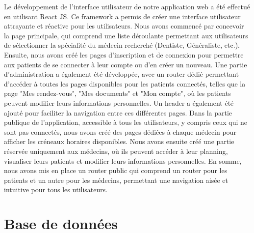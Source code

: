 \documentclass[a4paper]{report}
\begin{document}
Le développement de l'interface utilisateur de notre application web a été effectué en utilisant React JS. Ce framework a permis de créer une 
interface utilisateur attrayante et réactive pour les utilisateurs. \newline\newline
Nous avons commencé par concevoir la page principale, qui comprend une liste 
déroulante permettant aux utilisateurs de sélectionner la spécialité du médecin recherché (Dentiste, Généraliste, etc.). \newline\newline
Ensuite, nous avons créé les pages d'inscription et de connexion pour permettre aux patients de se connecter à leur compte ou d'en créer un nouveau.
Une partie d'administration a également été développée, avec un router dédié permettant d'accéder à toutes les pages disponibles pour les patients 
connectés, telles que la page "Mes rendez-vous", "Mes documents" et "Mon compte", où les patients peuvent modifier leurs informations personnelles. 
Un header a également été ajouté pour faciliter la navigation entre ces différentes pages.\newline\newline
Dans la partie publique de l'application, accessible à tous les utilisateurs, y compris ceux qui ne sont pas connectés, nous avons créé des pages 
dédiées à chaque médecin pour afficher les créneaux horaires disponibles. Nous avons ensuite créé une partie réservée uniquement aux médecins, où 
ils peuvent accéder à leur planning, visualiser leurs patients et modifier leurs informations personnelles. \newline
En somme, nous avons mis en place un router public qui comprend un router pour les patients et un autre pour les médecins, permettant une navigation aisée et intuitive pour tous les utilisateurs.

\section{Base de données}
\end{document}
